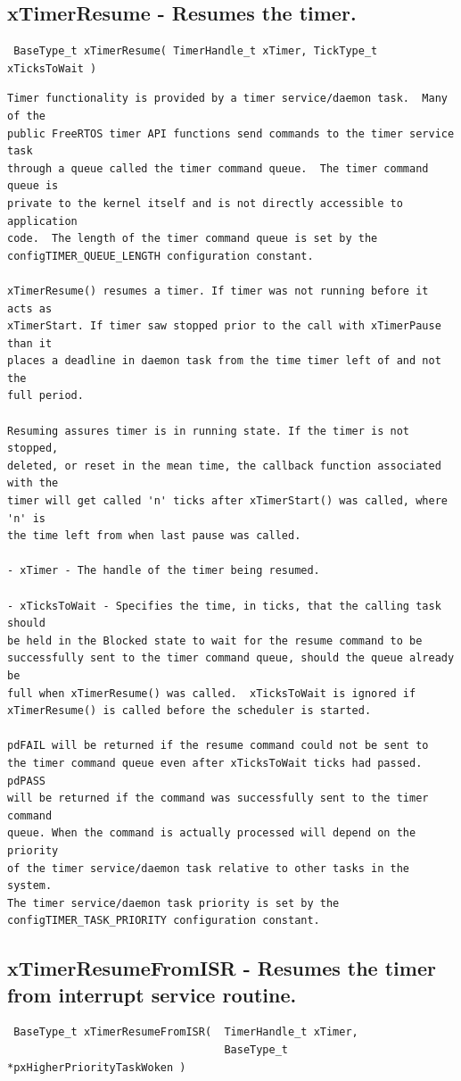 \subsection{xTimerResume -  Resumes the timer.}
\label{rt_cmd:xTimerResume}
\begin{verbatim}
 BaseType_t xTimerResume( TimerHandle_t xTimer, TickType_t xTicksToWait )
\end{verbatim}
\begin{lstlisting}
Timer functionality is provided by a timer service/daemon task.  Many of the
public FreeRTOS timer API functions send commands to the timer service task
through a queue called the timer command queue.  The timer command queue is
private to the kernel itself and is not directly accessible to application
code.  The length of the timer command queue is set by the
configTIMER_QUEUE_LENGTH configuration constant.

xTimerResume() resumes a timer. If timer was not running before it acts as
xTimerStart. If timer saw stopped prior to the call with xTimerPause than it
places a deadline in daemon task from the time timer left of and not the
full period.

Resuming assures timer is in running state. If the timer is not stopped,
deleted, or reset in the mean time, the callback function associated with the
timer will get called 'n' ticks after xTimerStart() was called, where 'n' is
the time left from when last pause was called.

- xTimer - The handle of the timer being resumed.

- xTicksToWait - Specifies the time, in ticks, that the calling task should
be held in the Blocked state to wait for the resume command to be
successfully sent to the timer command queue, should the queue already be
full when xTimerResume() was called.  xTicksToWait is ignored if
xTimerResume() is called before the scheduler is started.

pdFAIL will be returned if the resume command could not be sent to
the timer command queue even after xTicksToWait ticks had passed.  pdPASS
will be returned if the command was successfully sent to the timer command
queue. When the command is actually processed will depend on the priority
of the timer service/daemon task relative to other tasks in the system.
The timer service/daemon task priority is set by the
configTIMER_TASK_PRIORITY configuration constant.
\end{lstlisting}

\subsection{xTimerResumeFromISR -  Resumes the timer from interrupt service routine.}
\label{rt_cmd:xTimerResumeFromISR}
\begin{verbatim}
 BaseType_t xTimerResumeFromISR(  TimerHandle_t xTimer,
                                  BaseType_t *pxHigherPriorityTaskWoken )
\end{verbatim}

